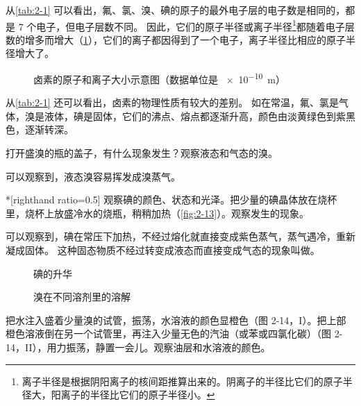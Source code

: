从\cref{tab:2-1} 可以看出，氟、氯、溴、碘的原子的最外电子层的电子数是相同的，都是 7 个电子，但电子层数不同。
因此，它们的原子半径或离子半径\footnote{离子半径是根据阴阳离子的核间距推算出来的。阴离子的半径比它们的原子半径大，阳离子的半径比它们的原子半径小。}都随着电子层数的增多而增大（\cref{fig:2-12}），它们的离子都因得到了一个电子，离子半径比相应的原子半径增大了。

\begin{figure}
  \caption{卤素的原子和离子大小示意图（数据单位是 \qty{e-10}{m}）}\label{fig:2-12}
\end{figure}

从\cref{tab:2-1} 还可以看出，卤素的物理性质有较大的差别。
如在常温，氟、氯是气体，溴是液体，碘是固体，它们的沸点、熔点都逐渐升高，颜色由淡黄绿色到紫黑色，逐渐转深。

\begin{Experiment}
  打开盛溴的瓶的盖子，有什么现象发生？观察液态和气态的溴。
\end{Experiment}

可以观察到，液态溴容易挥发成溴蒸气。

\begin{Experiment}*[righthand ratio=0.5]
  观察碘的颜色、状态和光泽。把少量的碘晶体放在烧杯里，烧杯上放盛冷水的烧瓶，稍稍加热（\cref{fig:2-13}）。观察发生的现象。
\end{Experiment}

可以观察到，碘在常压下加热，不经过熔化就直接变成紫色蒸气，蒸气遇冷，重新凝成固体。
这种固态物质不经过转变成液态而直接变成气态的现象叫做。
\begin{figure}
  \begin{minipage}[b]{0.48\linewidth}\centering
    \caption{碘的升华}\label{fig:2-13}
  \end{minipage}
  \begin{minipage}[b]{0.48\linewidth}\centering
    \caption{溴在不同溶剂里的溶解}\label{fig:2-14}
  \end{minipage}
\end{figure}

\begin{Experiment}
  把水注入盛着少量溴的试管，振荡，水溶液的颜色显橙色（图 2-14，I）。把上部橙色溶液倒在另一个试管里，再注入少量无色的汽油（或苯或四氯化碳）（图 2-14，II），用力振荡，静置一会儿。观察油层和水溶液的颜色。
\end{Experiment}

